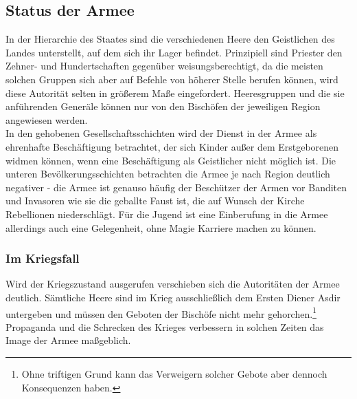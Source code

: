 \subsection{Status der Armee}
In der Hierarchie des Staates sind die verschiedenen Heere den Geistlichen des Landes unterstellt, auf dem sich ihr Lager befindet. 
Prinzipiell sind Priester den Zehner- und Hundertschaften gegenüber weisungsberechtigt, da die meisten solchen Gruppen sich aber auf Befehle von höherer Stelle berufen können, wird diese Autorität selten in größerem Maße eingefordert. 
Heeresgruppen und die sie anführenden Generäle können nur von den Bischöfen der jeweiligen Region angewiesen werden.\\
In den gehobenen Gesellschaftsschichten wird der Dienst in der Armee als ehrenhafte Beschäftigung betrachtet, der sich Kinder außer dem Erstgeborenen widmen können, wenn eine Beschäftigung als Geistlicher nicht möglich ist.
Die unteren Bevölkerungsschichten betrachten die Armee je nach Region deutlich negativer - die Armee ist genauso häufig der Beschützer der Armen vor Banditen und Invasoren wie sie die geballte Faust ist, die auf Wunsch der Kirche Rebellionen niederschlägt. 
Für die Jugend ist eine Einberufung in die Armee allerdings auch eine Gelegenheit, ohne Magie Karriere machen zu können.
\subsubsection{Im Kriegsfall}
Wird der Kriegszustand ausgerufen verschieben sich die Autoritäten der Armee deutlich. 
Sämtliche Heere sind im Krieg ausschließlich dem Ersten Diener Asdir untergeben und müssen den Geboten der Bischöfe nicht mehr gehorchen.\footnote{Ohne triftigen Grund kann das Verweigern solcher Gebote aber dennoch Konsequenzen haben.}
Propaganda und die Schrecken des Krieges verbessern in solchen Zeiten das Image der Armee maßgeblich.

